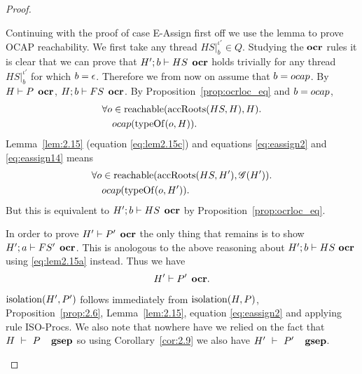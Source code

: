 \begin{proof}
\begin{description}
\begin{description}
\begin{description}
              Continuing with the proof of case {\sc E-Assign} first off we use
              the lemma to prove OCAP reachability.  We first take any thread
              $HS|_b^{\iota'} \in Q$. Studying the $\mbox{\bf ocr}$ rules it is clear that we can
              prove that $H'; b \vdash HS \:\: \mbox{\bf ocr}$ holds trivially for any
              thread $HS|_b^{\iota'}$ for which $b = \mbox{$\epsilon$}$. Therefore we from now on
              assume that $b = \mbox{$ocap$}$.  By $H \vdash P \:\: \mbox{\bf ocr}$, $H; b \vdash
              FS \:\: \mbox{\bf ocr}$. By Proposition~\ref{prop:ocrloc_eq} and $b =
              \mbox{$ocap$}$,
              \begin{equation}\label{eq:eassign14}
                \begin{aligned}
                  \forall o &\in \mbox{$\mathrm{reachable}$}(\mbox{$\mathrm{accRoots}$}(HS, H), H). \\
                            &\mbox{$ocap$}(\mbox{$\mathrm{typeOf}$}(o, H)).
                \end{aligned}
              \end{equation}
              Lemma~\ref{lem:2.15} (equation \eqref{eq:lem2.15c}) and equations
              \eqref{eq:eassign2} and \eqref{eq:eassign14} means 
              \begin{equation}
                \begin{aligned}
                  \forall o &\in \mbox{$\mathrm{reachable}$}(\mbox{$\mathrm{accRoots}$}(HS, H'), \mathscr{G}(H')). \\
                            &\mbox{$ocap$}(\mbox{$\mathrm{typeOf}$}(o, H')).
                \end{aligned}
              \end{equation}
              But this is equivalent to $H';b \vdash HS \:\: \mbox{\bf ocr}$ by
              Proposition~\ref{prop:ocrloc_eq}. 

              In order to prove $H' \vdash P' \:\: \mbox{\bf ocr}$ the only thing that
              remains is to show $H';a \vdash FS' \:\: \mbox{\bf ocr}$. This is anologous
              to the above reasoning about $H';b \vdash HS~\mbox{\bf ocr}$ using
              \eqref{eq:lem2.15a} instead. Thus we have
              \begin{equation*}
                H' \vdash P' \:\: \mbox{\bf ocr}.
              \end{equation*}

              $\mbox{$\mathrm{isolation}$}(H', P')$ follows immediately from $\mbox{$\mathrm{isolation}$}(H, P)$,
              Proposition~\ref{prop:2.6}, Lemma~\ref{lem:2.15}, equation
              \eqref{eq:eassign2} and applying rule {\sc ISO-Procs}. We also
              note that nowhere have we relied on the fact that
              $H~\vdash~P~\:\:~\mbox{\bf gsep}$ so using Corollary~\ref{cor:2.9} we also
              have $H'~\vdash~P'~\:\:~\mbox{\bf gsep}$.


\end{description}
\end{description}
\end{description}
\end{proof}

